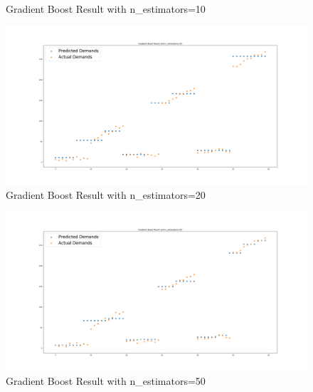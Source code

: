 \documentclass[a4paper]{article}
\begin{document}
\begin{enumerate}[(a)]
\begin{figure}[H]
            \caption{Gradient Boost Result with n\_estimators=10}
        \end{figure}
        \begin{figure}[H]
            \centering
            \includegraphics[scale=0.25]{P1c5.png}
            \caption{Gradient Boost Result with n\_estimators=20}
        \end{figure}
        \begin{figure}[H]
            \centering
            \includegraphics[scale=0.25]{P1c6.png}
            \caption{Gradient Boost Result with n\_estimators=50}
        \end{figure}
    \end{enumerate}
\end{document}
